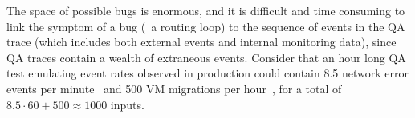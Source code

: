 The space of possible bugs is enormous, and it is difficult and time
consuming to link the
symptom of a bug (\eg~a routing loop) to the sequence of events in the QA
trace (which includes both external events and internal monitoring data),
since QA traces contain a wealth
of extraneous events.
Consider that an hour long QA test
emulating event rates observed in production could contain 8.5 network error events per
minute~\cite{Greenberg:2009:VSF:1592568.1592576} and 500 VM migrations per
hour~\cite{Soundararajan:2010:CBS:1899928.1899941},
for a total of $8.5 \cdot 60 + 500 \approx 1000$ inputs.


